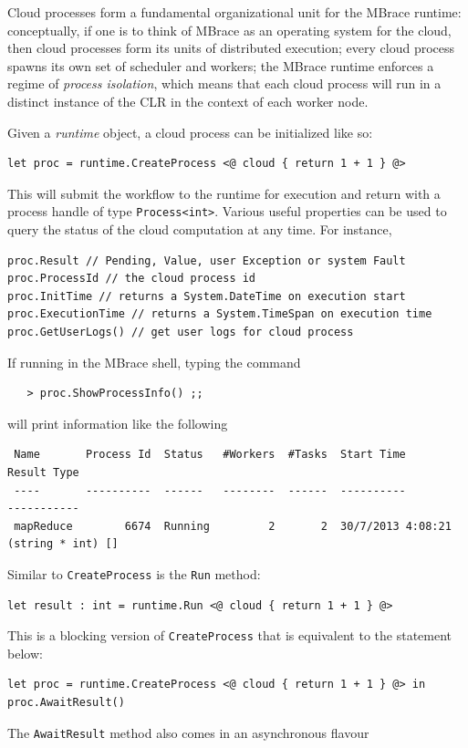 \documentclass[9pt,a4paper]{article}
\newcommand{\mbrace}{MBrace}
\begin{document}
Cloud processes form a fundamental organizational unit for the \mbrace{} runtime:
conceptually, if one is to think of \mbrace{} as an operating system for the cloud,
then cloud processes form its units of distributed execution;
every cloud process spawns its own set of scheduler and workers;
the \mbrace{} runtime enforces a regime of \emph{process isolation},
which means that each cloud process will run in a distinct instance of the CLR in the context
of each worker node.

Given a \emph{runtime} object, a cloud process can be initialized like so:
\begin{lstlisting}
let proc = runtime.CreateProcess <@ cloud { return 1 + 1 } @>
\end{lstlisting}
This will submit the workflow to the runtime for execution and return with a process handle of
type \texttt{Process<int>}. Various useful properties can be used to query the status of the
cloud computation at any time. For instance,
\begin{lstlisting}
proc.Result // Pending, Value, user Exception or system Fault
proc.ProcessId // the cloud process id
proc.InitTime // returns a System.DateTime on execution start
proc.ExecutionTime // returns a System.TimeSpan on execution time
proc.GetUserLogs() // get user logs for cloud process
\end{lstlisting}
If running in the \mbrace{} shell, typing the command
\begin{verbatim}
   > proc.ShowProcessInfo() ;;
\end{verbatim}
will print information like the following
\begin{verbatim}
 Name       Process Id  Status   #Workers  #Tasks  Start Time         Result Type       
 ----       ----------  ------   --------  ------  ----------         -----------       
 mapReduce        6674  Running         2       2  30/7/2013 4:08:21  (string * int) [] 
\end{verbatim}
Similar to \texttt{CreateProcess} is the \texttt{Run} method:
\begin{lstlisting}
let result : int = runtime.Run <@ cloud { return 1 + 1 } @>
\end{lstlisting}
This is a blocking version of \texttt{CreateProcess} that is equivalent to the statement below:
\begin{lstlisting}
let proc = runtime.CreateProcess <@ cloud { return 1 + 1 } @> in
proc.AwaitResult()
\end{lstlisting}
%
The \texttt{AwaitResult} method also comes in an asynchronous flavour
\end{document}
